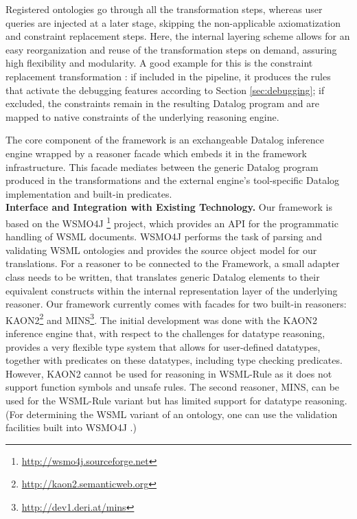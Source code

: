 Registered ontologies go through all the transformation steps,
whereas user queries are injected at a later stage, skipping the
non-applicable axiomatization and constraint replacement steps.
Here, the internal layering scheme allows for an easy
reorganization and reuse of the transformation steps on demand,
assuring high flexibility and modularity. A good example for this
is the constraint replacement transformation \transdebug: if
included in the pipeline, it produces the rules that activate the
debugging features according to Section \ref{sec:debugging}; if
excluded, the constraints remain in the resulting Datalog program
and are mapped to native constraints of the underlying reasoning
engine.

The core component of the framework is an exchangeable Datalog
inference engine wrapped by a reasoner facade which embeds it in the
framework infrastructure. This facade mediates between the generic
Datalog program produced in the transformations and the external
engine's tool-specific Datalog implementation and built-in
predicates.\\[2mm]
{\bfseries Interface and Integration with Existing Technology.}
Our framework is based on the WSMO4J
\footnote{\url{http://wsmo4j.sourceforge.net}} project, which
provides an API for the programmatic handling of WSML documents.
WSMO4J performs the task of parsing and validating WSML ontologies
and provides the source object model for our translations. For a
reasoner to be connected to the Framework, a small adapter class
needs to be written, that translates generic Datalog elements to
their equivalent constructs within the internal representation
layer of the underlying reasoner. Our framework currently comes
with facades for two built-in reasoners:
KAON2\footnote{\url{http://kaon2.semanticweb.org}} and
MINS\footnote{\url{http://dev1.deri.at/mins}}. The initial
development was done with the KAON2 inference engine that, with
respect to the challenges for datatype reasoning, provides a very
flexible type system that allows for user-defined datatypes,
together with predicates on these datatypes, including type
checking predicates. However, KAON2 cannot be used for reasoning
in WSML-Rule as it does not support function symbols and unsafe
rules. The second reasoner, MINS, can be used for the WSML-Rule
variant but has limited support for datatype reasoning. (For
determining the WSML variant of an ontology, one can use the
validation facilities built into WSMO4J
.)
